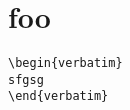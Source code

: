 \documentclass{article}
\begin{document}
\lstlistoflistings

\section{foo}

\begin{lstlisting}[caption={A listing}]
\begin{verbatim}
sfgsg
\end{verbatim}
\end{lstlisting}
\end{document}
